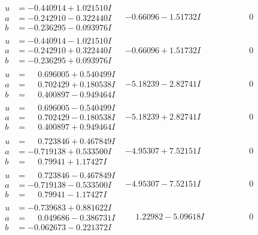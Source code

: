 \documentclass[1p]{elsarticle_modified}
\theoremstyle{definition}
\begin{document}
$$\begin{array}{c|c|c}
\begin{aligned}
u &= -0.440914 + 1.021510 I \\
a &= -0.242910 - 0.322440 I \\
b &= -0.236295 - 0.093976 I\end{aligned}
 & -0.66096 - 1.51732 I & \phantom{-0.000000 } 0 \\ \hline\begin{aligned}
u &= -0.440914 - 1.021510 I \\
a &= -0.242910 + 0.322440 I \\
b &= -0.236295 + 0.093976 I\end{aligned}
 & -0.66096 + 1.51732 I & \phantom{-0.000000 } 0 \\ \hline\begin{aligned}
u &= \phantom{-}0.696005 + 0.540499 I \\
a &= \phantom{-}0.702429 + 0.180538 I \\
b &= \phantom{-}0.400897 - 0.949464 I\end{aligned}
 & -5.18239 - 2.82741 I & \phantom{-0.000000 } 0 \\ \hline\begin{aligned}
u &= \phantom{-}0.696005 - 0.540499 I \\
a &= \phantom{-}0.702429 - 0.180538 I \\
b &= \phantom{-}0.400897 + 0.949464 I\end{aligned}
 & -5.18239 + 2.82741 I & \phantom{-0.000000 } 0 \\ \hline\begin{aligned}
u &= \phantom{-}0.723846 + 0.467849 I \\
a &= -0.719138 + 0.533500 I \\
b &= \phantom{-}0.79941 + 1.17427 I\end{aligned}
 & -4.95307 + 7.52151 I & \phantom{-0.000000 } 0 \\ \hline\begin{aligned}
u &= \phantom{-}0.723846 - 0.467849 I \\
a &= -0.719138 - 0.533500 I \\
b &= \phantom{-}0.79941 - 1.17427 I\end{aligned}
 & -4.95307 - 7.52151 I & \phantom{-0.000000 } 0 \\ \hline\begin{aligned}
u &= -0.739683 + 0.881622 I \\
a &= \phantom{-}0.049686 - 0.386731 I \\
b &= -0.062673 - 0.221372 I\end{aligned}
 & \phantom{-}1.22982 - 5.09618 I & \phantom{-0.000000 } 0 \\ \hline\begin{aligned}

\end{aligned}
\end{array}$$
\end{document}
